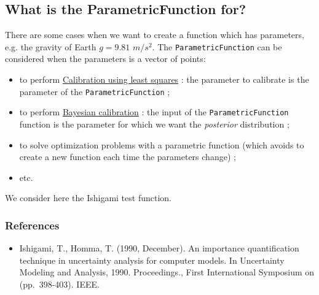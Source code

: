 \documentclass[11pt]{article}
\providecommand{\tightlist}{%
      \setlength{\itemsep}{0pt}\setlength{\parskip}{0pt}}
\begin{document}
    \hypertarget{what-is-the-parametricfunction-for}{%
\subsection{What is the ParametricFunction
for?}\label{what-is-the-parametricfunction-for}}

There are some cases when we want to create a function which has
parameters, e.g. the gravity of Earth $g = 9.81$ $m/s^2$.
The \texttt{ParametricFunction} can be considered when the
parameters is a vector of points:

\begin{itemize}
\tightlist
\item
  to perform
  \href{https://openturns.github.io/openturns/latest/auto_calibration/least_squares_and_gaussian_calibration/plot_calibration_deflection_tube.html\#sphx-glr-auto-calibration-least-squares-and-gaussian-calibration-plot-calibration-deflection-tube-py}{Calibration
  using least squares} : the parameter to calibrate is the parameter of
  the \texttt{ParametricFunction} ;
\item
  to perform
  \href{https://openturns.github.io/openturns/latest/auto_calibration/bayesian_calibration/plot_bayesian_calibration_flooding.html}{Bayesian
  calibration} : the input of the \texttt{ParametricFunction} function
  is the parameter for which we want the \emph{posterior} distribution ;
\item
  to solve optimization problems with a parametric function (which
  avoids to create a new function each time the parameters change) ;
\item
  etc.
\end{itemize}

We consider here the Ishigami test function.

\hypertarget{references}{%
\subsubsection{References}\label{references}}

\begin{itemize}
\tightlist
\item
  Ishigami, T., Homma, T. (1990, December). An importance quantification
  technique in uncertainty analysis for computer models. In Uncertainty
  Modeling and Analysis, 1990. Proceedings., First International
  Symposium on (pp.~398-403). IEEE.
\end{itemize}
\end{document}
